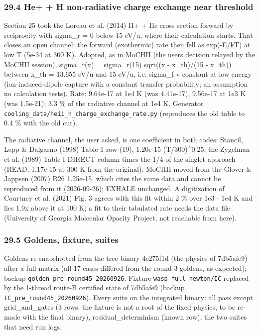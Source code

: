 \documentclass[english,a4paper]{my_memo}
\begin{document}
\subsubsection{29.4 He+ + H non-radiative charge exchange near threshold}\label{294-he--h-non-radiative-charge-exchange-near-threshold}

Section 25 took the Loreau et al. (2014) H+ + He cross section forward by
reciprocity with sigma\_r = 0 below 15 eV/u, where their calculation starts.
That closes an open channel: the forward (exothermic) rate then fell as
exp(-E/kT) at low T (5e-34 at 300 K). Adopted, as in MoCHII (the user\textquotesingle s
decision relayed by the MoCHII session), sigma\_r(x) = sigma\_r(15)
sqrt((x - x\_th)/(15 - x\_th)) between x\_th = 13.655 eV/u and 15 eV/u, i.e.
sigma\_f v constant at low energy (ion-induced-dipole capture with a
constant transfer probability; an assumption no calculation tests).
Rate: 9.64e-17 at 1e4 K (was 4.41e-17), 9.56e-17 at 1e3 K (was 1.5e-21);
3.3 \% of the radiative channel at 1e4 K. Generator
\texttt{cooling\_data/heii\_h\_charge\_exchange\_rate.py} (reproduces the old table to
0.4 \% with the old cut).

The radiative channel, the user asked, is one coefficient in both codes:
Stancil, Lepp \& Dalgarno (1998) Table 1 row (19), 1.20e-15 (T/300)\^{}0.25,
the Zygelman et al. (1989) Table I DIRECT column times the 1/4 of the
singlet approach (READ; 1.17e-15 at 300 K from the original). MoCHII moved
from the Glover \& Jappsen (2007) R26 1.25e-15, which cites the same data
and cannot be reproduced from it (2026-09-26); EXHALE unchanged. A
digitization of Courtney et al. (2021) Fig. 3 agrees with this fit within
2 \% over 1e3 - 1e4 K and lies 1.9x above it at 100 K; a fit to their
tabulated rate needs the data file (University of Georgia Molecular
Opacity Project, not reachable from here).

\subsubsection{29.5 Goldens, fixture, suites}\label{295-goldens-fixture-suites}

Goldens re-snapshotted from the tree binary 4e275f1d (the physics of
7db5afe9) after a full matrix (all 17 cases differed from the round-3
goldens, as expected); backup \texttt{golden\_pre\_round45\_20260926}. Fixture
\texttt{wasp\_full\_newton/IC} replaced by the 1-thread route-B certified state of
7db5afe9 (backup \texttt{IC\_pre\_round45\_20260926}). Every suite on the integrated
binary: all pass except grid\_and\_gates (3 rows: the fixture is not a root of
the fixed physics, to be re-made with the final binary), residual\_determinism
(known row), the two suites that need run logs.
\end{document}
